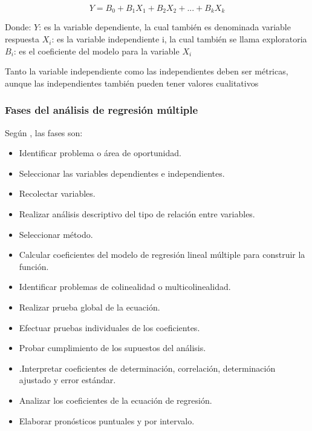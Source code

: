 \begin{equation}
    Y=B_{0}+B_{1}X_{1}+B_{2}X_{2}+...+B_{k}X_{k}
\end{equation}

Donde:
$Y$:  es la variable dependiente, la cual también es denominada variable respuesta
$X_{i}$:  es la variable independiente i, la cual también se llama exploratoria
$B_{i}$:  es el coeficiente del modelo para la variable $X_{i}$

Tanto la variable independiente como las independientes deben ser métricas, aunque las independientes también pueden tener valores cualitativos

\subsubsection{Fases del análisis de regresión múltiple}
Según \cite{pat2013introduccion}, las fases son:

\begin{itemize}
    \item Identificar problema o área de oportunidad.
    \item Seleccionar las variables dependientes e independientes.
    \item Recolectar variables.
    \item Realizar análisis descriptivo del tipo de relación entre variables.
    \item Seleccionar método.
    \item Calcular coeficientes del modelo de regresión lineal múltiple para construir la función.
    \item Identificar problemas de colinealidad o multicolinealidad.
    \item Realizar prueba global de la ecuación.
    \item Efectuar pruebas individuales de los coeficientes.
    \item Probar cumplimiento de los supuestos del análisis.
    \item .Interpretar coeficientes de determinación, correlación, determinación ajustado y error estándar.
    \item Analizar los coeficientes de la ecuación de regresión.
    \item Elaborar pronósticos puntuales y por intervalo.
\end{itemize}

